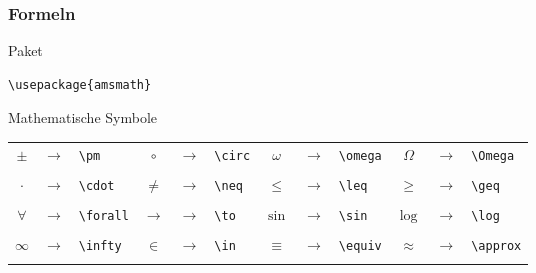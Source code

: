 \begin{frame}[fragile]
    \frametitle{Formeln}
    \begin{block}{Paket}
        \begin{lstlisting}
\usepackage{amsmath}
        \end{lstlisting}
    \end{block}
    \pause
    \begin{block}{Mathematische Symbole}
        \begin{tabular}{c@{\,}c@{\,}l @{$\quad$} 
                        c@{\,}c@{\,}l @{$\quad$} 
                        c@{\,}c@{\,}l @{$\quad$} 
                        c@{\,}c@{\,}l}
            $\pm$       & $\to$ & \verb!\pm!    & $\circ$   & $\to$ & \verb!\circ!  &
            $\omega$    & $\to$ & \verb!\omega! & $\Omega$  & $\to$ & \verb!\Omega! \\\\
            \pause
            $\cdot$     & $\to$ & \verb!\cdot!  & $\neq$    & $\to$ & \verb!\neq!   &
            $\leq$      & $\to$ & \verb!\leq!   & $\geq$    & $\to$ & \verb!\geq!   \\\\
            \pause
            $\forall$   & $\to$ & \verb!\forall!& $\to$     & $\to$ & \verb!\to!    &
            $\sin$      & $\to$ & \verb!\sin!   & $\log$    & $\to$ & \verb!\log!   \\\\
            \pause
            $\infty$    & $\to$ & \verb!\infty! & $\in$     & $\to$ & \verb!\in!    &
            $\equiv$    & $\to$ & \verb!\equiv! & $\approx$ & $\to$ & \verb!\approx!\\\\
        \end{tabular}
    \end{block}
\end{frame}

